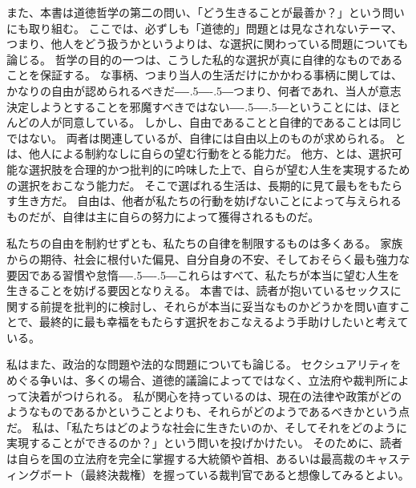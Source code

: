 \documentclass[paper=a4,book,openany]{jlreq}
\def\DDASH{―\kern-.5\zw―\kern-.5\zw―} %
\begin{document}
また、本書は道徳哲学の第二の問い、「どう生きることが最善か？」という問いにも取り組む。
ここでは、必ずしも「道徳的」問題とは見なされないテーマ、つまり、他人をどう扱うかというよりは、な選択に関わっている問題についても論じる。
哲学の目的の一つは、こうした私的な選択が真に自律的なものであることを保証する。
な事柄、つまり当人の生活だけにかかわる事柄に関しては、かなりの自由が認められるべきだ{\DDASH}つまり、何者であれ、当人が意志決定しようとすることを邪魔すべきではない{\DDASH}ということには、ほとんどの人が同意している。
しかし、自由であることと自律的であることは同じではない。
両者は関連しているが、自律には自由以上のものが求められる。
とは、他人による制約なしに自らの望む行動をとる能力だ。
他方、とは、選択可能な選択肢を合理的かつ批判的に吟味した上で、自らが望む人生を実現するための選択をおこなう能力だ。
そこで選ばれる生活は、長期的に見て最もをもたらす生き方だ。
自由は、他者が私たちの行動を妨げないことによって与えられるものだが、自律は主に自らの努力によって獲得されるものだ。

私たちの自由を制約せずとも、私たちの自律を制限するものは多くある。
家族からの期待、社会に根付いた偏見、自分自身の不安、そしておそらく最も強力な要因である習慣や怠惰{\DDASH}これらはすべて、私たちが本当に望む人生を生きることを妨げる要因となりえる。
本書では、読者が抱いているセックスに関する前提を批判的に検討し、それらが本当に妥当なものかどうかを問い直すことで、最終的に最も幸福をもたらす選択をおこなえるよう手助けしたいと考えている。

私はまた、政治的な問題や法的な問題についても論じる。
セクシュアリティをめぐる争いは、多くの場合、道徳的議論によってではなく、立法府や裁判所によって決着がつけられる。
私が関心を持っているのは、現在の法律や政策がどのようなものであるかということよりも、それらがどのようであるべきかという点だ。
私は、「私たちはどのような社会に生きたいのか、そしてそれをどのように実現することができるのか？」という問いを投げかけたい。
そのために、読者は自らを国の立法府を完全に掌握する大統領や首相、あるいは最高裁のキャスティングボート（最終決裁権）を握っている裁判官であると想像してみるとよい。
\end{document}
